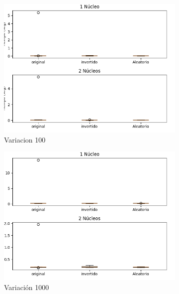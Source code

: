 \documentclass{article}
\begin{document}
\begin{figure}[h!]
\begin{subfigure}[b]{0.45\linewidth}
           \includegraphics[width=\linewidth]{Figure_1(100).png}
           \caption{Variacion 100}
           \label{fig:westminster_aerea}
        \end{subfigure}
        \begin{subfigure}[b]{0.45\linewidth}
           \includegraphics[width=\linewidth]{Figure_1(1000).png}
           \caption{Variaci\'on 1000}
           \label{fig:westminster_aerea}
        \end{subfigure}
      \begin{subfigure}[b]{0.45\linewidth}

\end{subfigure}
\end{figure}
\end{document}
